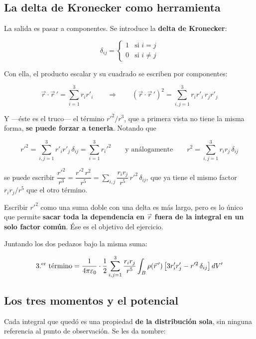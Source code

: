 \documentclass[12pt,a4paper]{article}
\begin{document}
\subsection{La delta de Kronecker como herramienta}

La salida es pasar a componentes. Se introduce la \textbf{delta de Kronecker}:

\[
\delta_{ij} = \begin{cases} 1 & \text{si } i = j\\ 0 & \text{si } i \neq j\end{cases}
\]

Con ella, el producto escalar y su cuadrado se escriben por componentes:

\[
\vec r\cdot\vec r\,' = \sum_{i=1}^{3} r_i r'_i
\qquad\Longrightarrow\qquad
(\vec r\cdot\vec r\,')^2 = \sum_{i,j=1}^{3} r_i r'_i\, r_j r'_j
\]

Y ---éste es el truco--- el término $r'^2/r^3$, que a primera vista no tiene la
misma forma, \textbf{se puede forzar a tenerla}. Notando que

\[
r'^2 = \sum_{i,j=1}^{3} r'_i r'_j\,\delta_{ij} = \sum_{i=1}^{3} r_i'^2
\qquad\text{y análogamente}\qquad
r^2 = \sum_{i,j=1}^{3} r_i r_j\,\delta_{ij}
\]

se puede escribir
$\dfrac{r'^2}{r^3} = \dfrac{r'^2\,r^2}{r^5} = \sum_{i,j}\dfrac{r_i r_j}{r^5}\,r'^2\,\delta_{ij}$,
que ya tiene el mismo factor $r_i r_j / r^5$ que el otro término.

\begin{notebox}
Escribir $r'^2$ como una suma doble con una delta es más largo, pero es lo único
que permite \textbf{sacar toda la dependencia en $\vec r$ fuera de la integral en
un solo factor común}. Ése es el objetivo del ejercicio.
\end{notebox}

Juntando los dos pedazos bajo la misma suma:

\[
\text{3.\textsuperscript{er} término} =
\frac{1}{4\pi\varepsilon_0}\cdot\frac{1}{2}\sum_{i,j=1}^{3}\frac{r_i r_j}{r^{5}}
\int_B \rho(\vec r\,')\left[3 r'_i r'_j - r'^2\,\delta_{ij}\right]dV'
\]

\subsection{Los tres momentos y el potencial}

Cada integral que quedó es una propiedad \textbf{de la distribución sola}, sin
ninguna referencia al punto de observación. Se les da nombre:
\end{document}

